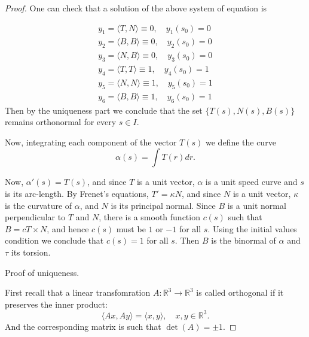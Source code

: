\documentclass{amsart}
\begin{document}
\begin{proof}
One can check that a solution of the above system of equation is

\begin{equation}
\begin{split}
y_1 = \langle T, N \rangle \equiv 0, \quad y_1 (s_0)= 0\\
y_2 = \langle B, B \rangle \equiv 0, \quad y_2 (s_0)= 0 \\
y_3 = \langle N, B \rangle \equiv 0, \quad y_3 (s_0)= 0 \\
y_4 = \langle T, T \rangle \equiv 1, \quad y_4 (s_0)= 1 \\
y_5 = \langle N, N \rangle \equiv 1, \quad y_5 (s_0)= 1 \\
y_6 = \langle B, B \rangle \equiv 1, \quad y_6 (s_0)= 1 
\end{split}
\end{equation}
Then by the uniqueness part we conclude that the set \(\{ T(s), N(s), B(s) \}\) remains orthonormal for every \(s\in I\).

Now, integrating each component of the vector \(T(s)\) we define the curve 
\[
\alpha(s) = \int T(r) dr. \]

Now, \(\alpha'(s) = T(s)\), and since \(T\) is a unit vector, \(\alpha\) is a unit speed curve and \(s\) is its arc-length. By Frenet's equations, \(T' = \kappa N\), and since \(N\) is a unit vector, \(\kappa\) is the curvature of \(\alpha\), and 
\(N\) is its principal normal. Since \(B\) is a unit normal perpendicular to \(T\) and \(N\), there is a smooth function  \(c(s)\) such that \(B = c T\times N\), and hence \(c(s)\) must be \(1\) or \(-1\) for all \(s\). Using the initial values condition we conclude that \(c(s) = 1\) for all \(s\). Then \(B\) is the binormal of \(\alpha\) and \(\tau\) its torsion.

Proof of uniqueness.

First recall that a linear transfomration \(A: \mathbb{R}^3 \to \mathbb{R}^3\) is called orthogonal if it preserves the inner product:
\[ \langle Ax, Ay \rangle = \langle x, y \rangle,\quad x,y\in\mathbb{R}^3. \]
And the corresponding matrix is such that \(\det(A) = \pm 1\).


\end{proof}
\end{document}
